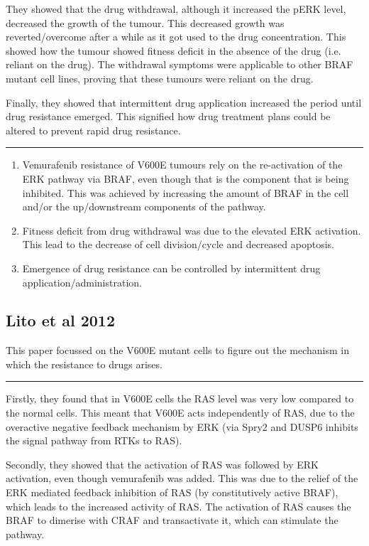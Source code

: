 \documentclass[a4paper,12pt]{article}
\begin{document}
They showed that the drug withdrawal, although it increased the pERK level, decreased the growth of the tumour.
This decreased growth was reverted/overcome after a while as it got used to the drug concentration.
This showed how the tumour showed fitness deficit in the absence of the drug (i.e. reliant on the drug).
The withdrawal symptoms were applicable to other BRAF mutant cell lines, proving that these tumours were reliant on the drug.

Finally, they showed that intermittent drug application increased the period until drug resistance emerged.
This signified how drug treatment plans could be altered to prevent rapid drug resistance.

\noindent\rule{\textwidth}{0.4pt}

\begin{enumerate}
\item Vemurafenib resistance of V600E tumours rely on the re-activation of the ERK pathway via BRAF, even though that is the component that is being inhibited.
This was achieved by increasing the amount of BRAF in the cell and/or the up/downstream components of the pathway.
\item Fitness deficit from drug withdrawal was due to the elevated ERK activation.
This lead to the decrease of cell division/cycle and decreased apoptosis.
\item Emergence of drug resistance can be controlled by intermittent drug application/administration.
\end{enumerate}

\subsection*{\normalsize{Lito et al 2012}}

This paper focussed on the V600E mutant cells to figure out the mechanism in which the resistance to drugs arises.

\noindent\rule{\textwidth}{0.4pt}

Firstly, they found that in V600E cells the RAS level was very low compared to the normal cells.
This meant that V600E acts independently of RAS, due to the overactive negative feedback mechanism by ERK (via Spry2 and DUSP6 inhibits the signal pathway from RTKs to RAS).

Secondly, they showed that the activation of RAS was followed by ERK activation, even though vemurafenib was added.
This was due to the relief of the ERK mediated feedback inhibition of RAS (by constitutively active BRAF), which leads to the increased activity of RAS.
The activation of RAS causes the BRAF to dimerise with CRAF and transactivate it, which can stimulate the pathway.
\end{document}
